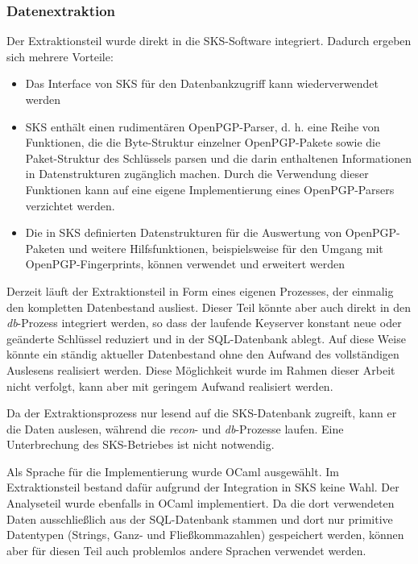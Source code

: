 \subsubsection{Datenextraktion}
\label{sec:datenextraktion}

Der Extraktionsteil wurde direkt in die SKS-Software
integriert. Dadurch ergeben sich mehrere Vorteile: 

\begin{itemize}
\item Das Interface von SKS für den Datenbankzugriff kann
  wiederverwendet werden
\item SKS enthält einen rudimentären OpenPGP-Parser, d. h. eine Reihe
  von Funktionen, die die Byte-Struktur einzelner OpenPGP-Pakete sowie
  die Paket-Struktur des Schlüssels parsen und die darin enthaltenen
  Informationen in Datenstrukturen zugänglich machen. Durch die
  Verwendung dieser Funktionen kann auf eine eigene Implementierung
  eines OpenPGP-Parsers verzichtet werden.
\item Die in SKS definierten Datenstrukturen für die Auswertung von
  OpenPGP-Paketen und weitere Hilfsfunktionen, beispielsweise für den
  Umgang mit OpenPGP-Fingerprints, können verwendet und erweitert werden
\end{itemize}

Derzeit läuft der Extraktionsteil in Form eines eigenen Prozesses, der
einmalig den kompletten Datenbestand ausliest. Dieser Teil könnte aber
auch direkt in den \emph{db}-Prozess integriert werden, so dass der
laufende Keyserver konstant neue oder geänderte Schlüssel reduziert
und in der SQL-Datenbank ablegt. Auf diese Weise könnte ein ständig
aktueller Datenbestand ohne den Aufwand des vollständigen Auslesens
realisiert werden. Diese Möglichkeit wurde im Rahmen dieser Arbeit
nicht verfolgt, kann aber mit geringem Aufwand realisiert werden.

Da der Extraktionsprozess nur lesend auf die SKS-Datenbank zugreift,
kann er die Daten auslesen, während die \emph{recon}- und
\emph{db}-Prozesse laufen. Eine Unterbrechung des SKS-Betriebes ist
nicht notwendig.

Als Sprache für die Implementierung wurde OCaml ausgewählt. Im
Extraktionsteil bestand dafür aufgrund der Integration in SKS keine
Wahl. Der Analyseteil wurde ebenfalls in OCaml implementiert. Da die
dort verwendeten Daten ausschließlich aus der SQL-Datenbank stammen
und dort nur primitive Datentypen (Strings, Ganz- und
Fließkommazahlen) gespeichert werden, können aber für diesen Teil
auch problemlos andere Sprachen verwendet werden.

